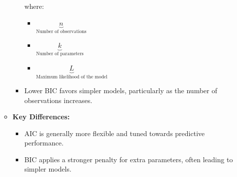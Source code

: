 \documentclass[10pt]{article}
\begin{document}
\begin{itemize}
\begin{itemize}
\begin{itemize}
\[            \]
            where:
            \begin{itemize}
                \item \(\underbrace{n}_{\text{Number of observations}}\)
                \item \(\underbrace{k}_{\text{Number of parameters}}\)
                \item \(\underbrace{L}_{\text{Maximum likelihood of the model}}\)
            \end{itemize}
            \item Lower BIC favors simpler models, particularly as the number of observations increases.
        \end{itemize}
        \item \textbf{Key Differences:}
        \begin{itemize}
            \item AIC is generally more flexible and tuned towards predictive performance.
            \item BIC applies a stronger penalty for extra parameters, often leading to simpler models.
        \end{itemize}
    \end{itemize}
\end{itemize}
\end{document}
